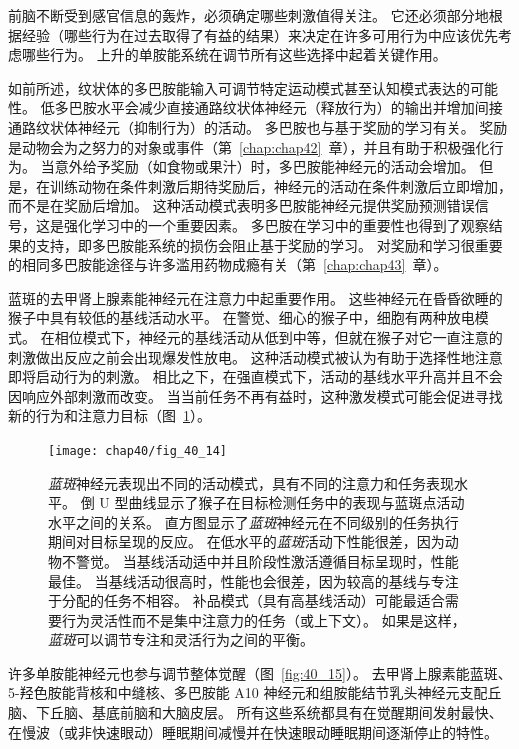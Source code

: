 前脑不断受到感官信息的轰炸，必须确定哪些刺激值得关注。
它还必须部分地根据经验（哪些行为在过去取得了有益的结果）来决定在许多可用行为中应该优先考虑哪些行为。
上升的单胺能系统在调节所有这些选择中起着关键作用。


如前所述，纹状体的多巴胺能输入可调节特定运动模式甚至认知模式表达的可能性。
低多巴胺水平会减少直接通路纹状体神经元（释放行为）的输出并增加间接通路纹状体神经元（抑制行为）的活动。
多巴胺也与基于奖励的学习有关。 奖励是动物会为之努力的对象或事件（第~\ref{chap:chap42}~章），并且有助于积极强化行为。
当意外给予奖励（如食物或果汁）时，多巴胺能神经元的活动会增加。
但是，在训练动物在条件刺激后期待奖励后，神经元的活动在条件刺激后立即增加，而不是在奖励后增加。
这种活动模式表明多巴胺能神经元提供奖励预测错误信号，这是强化学习中的一个重要因素。
多巴胺在学习中的重要性也得到了观察结果的支持，即多巴胺能系统的损伤会阻止基于奖励的学习。
对奖励和学习很重要的相同多巴胺能途径与许多滥用药物成瘾有关（第~\ref{chap:chap43}~章）。


蓝斑的去甲肾上腺素能神经元在注意力中起重要作用。
这些神经元在昏昏欲睡的猴子中具有较低的基线活动水平。
在警觉、细心的猴子中，细胞有两种放电模式。
在相位模式下，神经元的基线活动从低到中等，但就在猴子对它一直注意的刺激做出反应之前会出现爆发性放电。
这种活动模式被认为有助于选择性地注意即将启动行为的刺激。
相比之下，在强直模式下，活动的基线水平升高并且不会因响应外部刺激而改变。
当当前任务不再有益时，这种激发模式可能会促进寻找新的行为和注意力目标（图~\ref{fig:40_14}）。


\begin{figure}[htbp]
	\centering
	\texttt{[image: chap40/fig\_40\_14]}
	\caption{\textit{蓝斑}神经元表现出不同的活动模式，具有不同的注意力和任务表现水平。
		倒 U 型曲线显示了猴子在目标检测任务中的表现与蓝斑点活动水平之间的关系。
		直方图显示了\textit{蓝斑}神经元在不同级别的任务执行期间对目标呈现的反应。
		在低水平的\textit{蓝斑}活动下性能很差，因为动物不警觉。
		当基线活动适中并且阶段性激活遵循目标呈现时，性能最佳。
		当基线活动很高时，性能也会很差，因为较高的基线与专注于分配的任务不相容。
		补品模式（具有高基线活动）可能最适合需要行为灵活性而不是集中注意力的任务（或上下文）。
		如果是这样，\textit{蓝斑}可以调节专注和灵活行为之间的平衡\cite{aston1999role}。}
	\label{fig:40_14}
\end{figure}


许多单胺能神经元也参与调节整体觉醒（图~\ref{fig:40_15}）。
去甲肾上腺素能蓝斑、5-羟色胺能背核和中缝核、多巴胺能 A10 神经元和组胺能结节乳头神经元支配丘脑、下丘脑、基底前脑和大脑皮层。
所有这些系统都具有在觉醒期间发射最快、在慢波（或非快速眼动）睡眠期间减慢并在快速眼动睡眠期间逐渐停止的特性。


